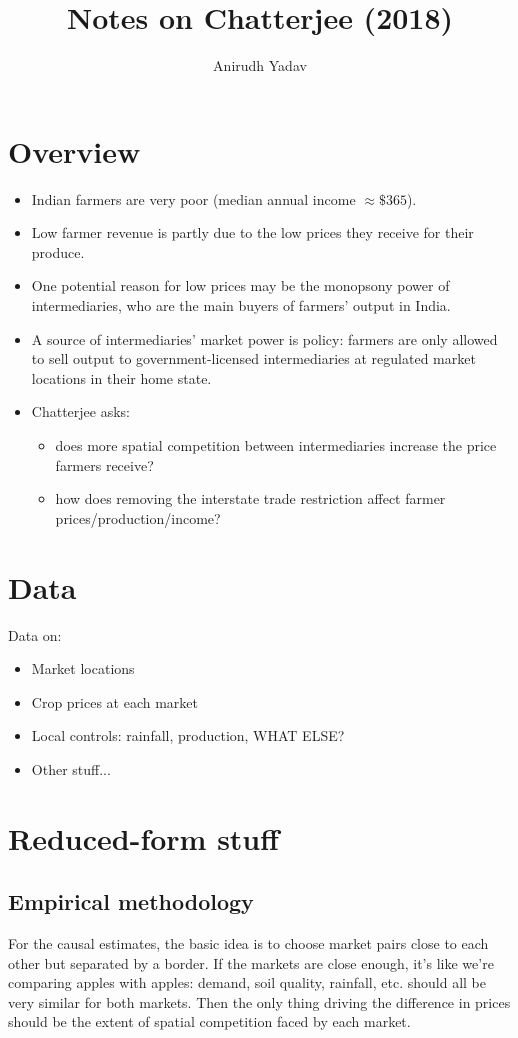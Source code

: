 \documentclass[12pt]{article}
\title{Notes on Chatterjee (2018)}
\author{Anirudh Yadav}
\begin{document}
\maketitle

\section{Overview}
\begin{itemize}
\item Indian farmers are very poor (median annual income $\approx \$365$).
\item Low farmer revenue is partly due to the low prices they receive for their produce.
\item One potential reason for low prices may be the monopsony power of intermediaries, who are the main buyers of farmers' output in India.
\item A source of intermediaries' market power is policy: farmers are only allowed to sell output to government-licensed intermediaries at regulated market locations in their home state.
\item Chatterjee asks: 
\begin{itemize}
\item does more spatial competition between intermediaries increase the price farmers receive?
\item how does removing the interstate trade restriction affect farmer prices/production/income?
\end{itemize}
\end{itemize}

\section{Data}
Data on:
\begin{itemize}
\item Market locations
\item Crop prices at each market
\item Local controls: rainfall, production, WHAT ELSE?
\item Other stuff...
\end{itemize}


\section{Reduced-form stuff}

\subsection{Empirical methodology}
For the causal estimates, the basic idea is to choose market pairs close to each other but separated by a border. If the markets are close enough, it's like we're comparing apples with apples: demand, soil quality, rainfall, etc. should all be very similar for both markets. Then the only thing driving the difference in prices should be the extent of spatial competition faced by each market.
\end{document}
